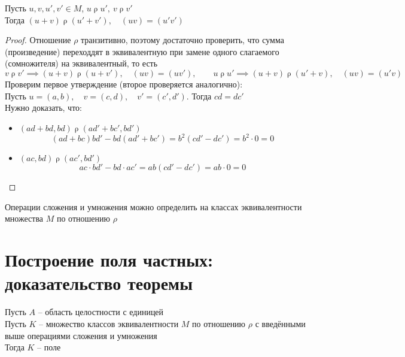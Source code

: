 \begin{lemma}
	Пусть $u, v, u', v' \in M$, $u \mathrel\rho u', ~ v \mathrel\rho v'$ \\
	Тогда $(u + v) \mathrel\rho (u' + v'), \quad (uv) = (u'v') $
\end{lemma}

\begin{proof}
	Отношение $\rho$ транзитивно, поэтому достаточно проверить, что сумма (произведение) переходдят в эквивалентную при замене одного слагаемого (сомножителя) на эквивалентный, то есть
	$$ v \mathrel\rho v' \implies (u + v) \mathrel\rho (u + v'), \quad (uv) = (uv'), \qquad u \mathrel\rho u' \implies (u + v) \mathrel\rho (u' + v), \quad (uv) = (u'v) $$
	Проверим первое утверждение (второе проверяется аналогично): \\
	Пусть $u = (a, b), \quad v = (c, d), \quad v' = (c', d') $. Тогда $cd = dc' $ \\
	Нужно доказать, что:
	\begin{itemize}
		\item $(ad + bd, bd) \mathrel\rho (ad' + bc', bd') $
		$$ (ad + bc)bd' - bd(ad' + bc') = b^2(cd' - dc') = b^2 \cdot 0 = 0 $$
		\item $(ac, bd) \mathrel\rho (ac', bd') $
		$$ ac \cdot bd' - bd \cdot ac' = ab(cd' - dc') = ab \cdot 0 = 0 $$
	\end{itemize}
\end{proof}

\begin{implication}
	Операции сложения и умножения можно определить на классах эквивалентности множества $M$ по отношению $\rho$
\end{implication}

\section{Построение поля частных: доказательство теоремы}

\begin{theorem}
	Пусть $A$ -- область целостности с единицей \\
	Пусть $K$ -- множество классов эквивалентности $M$ по отношению $\rho$ с введёнными выше операциями сложения и умножения \\
	Тогда $K$ -- поле
\end{theorem}

